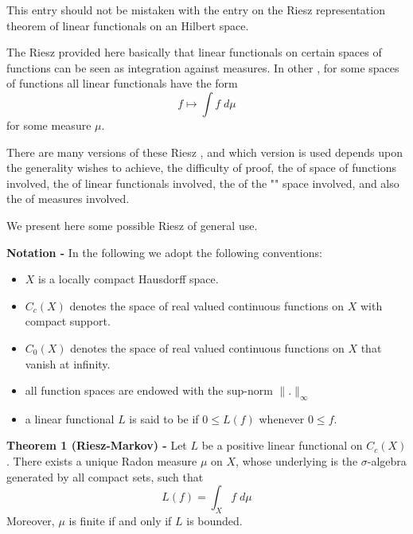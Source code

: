 \documentclass[12pt]{article}
\begin{document}

This entry should not be mistaken with the entry on the Riesz representation theorem of  linear functionals on an Hilbert space.

The Riesz  provided here basically  that linear functionals on certain spaces of functions can be seen as integration against measures. In other , for some spaces of functions all linear functionals have the form
\begin{displaymath}
f \longmapsto \int f\; d\mu
\end{displaymath}
for some measure $\mu$.

There are many versions of these Riesz , and which version is used depends upon the generality  wishes to achieve, the difficulty of proof, the  of space of functions involved, the  of linear functionals involved, the  of the "" space involved, and also the  of measures involved.

We present here some possible Riesz  of general use.

{\bf Notation -} In the following we adopt the following conventions:
\begin{itemize}
\item $X$ is a locally compact Hausdorff space.
\item $C_c(X)$ denotes the space of real valued continuous functions on $X$ with compact support.
\item $C_0(X)$ denotes the space of real valued continuous functions on $X$ that vanish at infinity.
\item all function spaces are endowed with the sup-norm $\|.\|_{\infty}$
\item a linear functional $L$ is said to be  if $0 \leq L(f)$ whenever $0 \leq f$.
\end{itemize}

{\bf Theorem 1 (Riesz-Markov) -} Let $L$ be a positive linear functional on $C_c(X)$. There exists a unique Radon measure $\mu$ on $X$, whose underlying  is the $\sigma$-algebra generated by all compact sets, such that
\begin{displaymath}
L(f) = \int_X f \; d\mu
\end{displaymath}
Moreover, $\mu$ is finite if and only if $L$ is bounded.
\end{document}

